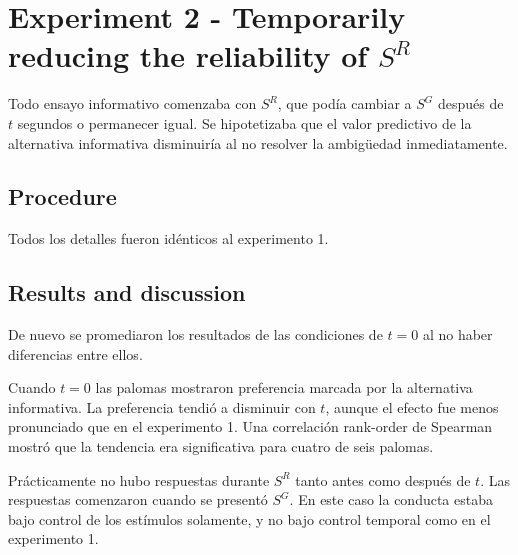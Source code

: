 \documentclass[a4paper,12pt]{article}
\begin{document}
\section{Experiment 2 - Temporarily reducing the reliability of $S^{R}$}

Todo ensayo informativo comenzaba con $S^{R}$, que podía cambiar a $S^{G}$ después de $t$ segundos o permanecer igual.
Se hipotetizaba que el valor predictivo de la alternativa informativa disminuiría al no resolver la ambigüedad inmediatamente.

\subsection{Procedure}

Todos los detalles fueron idénticos al experimento 1.

\subsection{Results and discussion}

De nuevo se promediaron los resultados de las condiciones de $t = 0$ al no haber diferencias entre ellos.

Cuando $t = 0$ las palomas mostraron preferencia marcada por la alternativa informativa.
La preferencia tendió a disminuir con $t$, aunque el efecto fue menos pronunciado que en el experimento 1.
Una correlación rank-order de Spearman mostró que la tendencia era significativa para cuatro de seis palomas.

Prácticamente no hubo respuestas durante $S^{R}$ tanto antes como después de $t$.
Las respuestas comenzaron cuando se presentó $S^{G}$.
En este caso la conducta estaba bajo control de los estímulos solamente, y no bajo control temporal como en el experimento 1.
\end{document}
